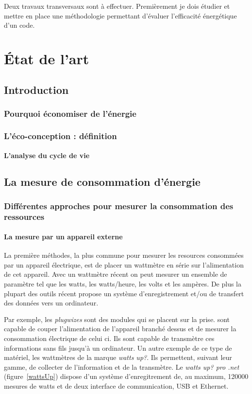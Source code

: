 \documentclass[a4paper, 11pt]{report}
\begin{document}
Deux travaux transversaux sont à effectuer. Premièrement je dois étudier et mettre en place une méthodologie permettant d'évaluer l'efficacité énergétique d'un code.

\chapter{État de l'art}
	\section{Introduction}
		\subsection{Pourquoi économiser de l'énergie}

		
		\subsection{L'éco-conception : définition}
			\subsubsection{L'analyse du cycle de vie}
			
		
	\section{La mesure de consommation d'énergie}
		\subsection{Différentes approches pour mesurer la consommation des ressources}
			\subsubsection{La mesure par un appareil externe}
La première méthodes, la plus commune pour mesurer les resources consommées par un appareil électrique, est de placer un wattmètre en série sur l'alimentation de cet appareil. Avec un wattmètre récent on peut mesurer un ensemble de paramètre tel que les watts, les watts/heure, les volts et les ampères. De plus la plupart des outils récent propose un système d'enregistrement et/ou de transfert des données vers un ordinateur.

Par exemple, les \textit{plugwizes} sont des modules qui se placent sur la prise. sont capable de couper l'alimentation de l'appareil branché dessus et de mesurer la consommation électrique de celui ci. Ils sont capable de transmètre ces informations sans fils jusqu'à un ordinateur. Un autre exemple de ce type de matériel, les wattmètres de la marque \textit{watts up\/?}. Ils permettent, suivant leur gamme, de collecter de l'information et de la transmètre. Le \textit{watts up\/? pro .net} (figure~\ref{wattsUp}) dispose d'un système d'enregitrement de, au maximum, 120000 mesures de watts et de deux interface de communication, USB et Ethernet.
\end{document}
